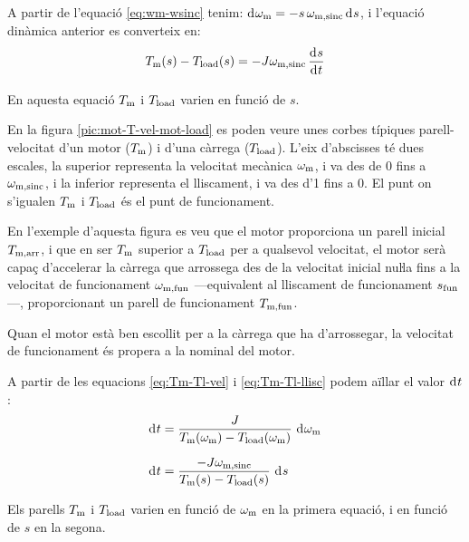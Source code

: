 A partir de l'equació \eqref{eq:wm-wsinc} tenim: $\diff \omega\ped{m} = -s\,\omega\ped{m,sinc} \diff s$, i l'equació dinàmica anterior es converteix en:
\begin{equation}\label{eq:Tm-Tl-llisc}
    T\ped{m}(s) - T\ped{load}(s) = -J \omega\ped{m,sinc}\,\frac{\diff s}{\diff t}
\end{equation}

En aquesta equació $T_\mathrm{m}$ i $T_\mathrm{load}$ varien en funció de $s$.


En la figura \vref{pic:mot-T-vel-mot-load} es poden veure unes corbes típiques parell-velocitat d'un motor ($T_\mathrm{m}$) i d'una  càrrega ($T_\mathrm{load}$). L'eix d'abscisses té dues escales, la superior representa la velocitat mecànica $\omega_\mathrm{m}$, i va des de 0 fins a $\omega_\mathrm{m,sinc}$, i la inferior representa el lliscament, i va des d'1 fins a 0. El punt on s'igualen $T_\mathrm{m}$ i $T_\mathrm{load}$ és el punt  de funcionament.

En l'exemple d'aquesta figura es veu que el motor proporciona un parell inicial $T_\mathrm{m,arr}$, i que en ser $T_\mathrm{m}$  superior a $T_\mathrm{load}$ per a qualsevol velocitat, el motor serà  capaç d'accelerar la càrrega que arrossega des de la velocitat inicial nuŀla fins a la velocitat de funcionament $\omega_\mathrm{m,fun}$ ---equivalent al lliscament de funcionament $s_\mathrm{fun}$---, proporcionant un parell de funcionament $T_\mathrm{m,fun}$.
\begin{center}
    
    \label{pic:mot-T-vel-mot-load}
\end{center}

 Quan el motor està ben escollit per a la càrrega que ha d'arrossegar, la velocitat de funcionament és propera a la nominal del motor.
 
A partir de les equacions \eqref{eq:Tm-Tl-vel} i \eqref{eq:Tm-Tl-llisc} podem aïllar el valor $\diff t$:
\begin{subequations}
\begin{align}
    \diff t &= \frac{J}{T\ped{m}(\omega\ped{m})-T\ped{load}(\omega\ped{m})}\,\diff\omega\ped{m}\\[1.5ex]
    \diff t &= \frac{-J \omega\ped{m,sinc}}{T\ped{m}(s)-T\ped{load}(s)}\,\diff s
\end{align}
\end{subequations}

Els parells $T_\mathrm{m}$ i $T_\mathrm{load}$ varien en funció de $\omega_\mathrm{m}$ en la primera equació, i en funció de $s$ en la segona.


